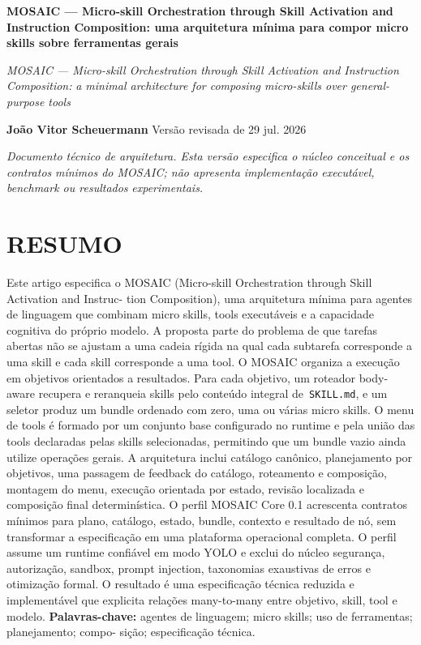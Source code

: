 \documentclass[12pt,a4paper]{article}
\begin{document}
\begin{center}\textbf{MOSAIC — Micro-skill Orchestration through Skill Activation and Instruction Composition: uma arquitetura mínima para compor micro skills sobre ferramentas gerais}\par\end{center}

\textit{MOSAIC — Micro-skill Orchestration through Skill Activation and Instruction Composition:} \textit{a minimal architecture for composing micro-skills over general-purpose tools}


\begin{center}\textbf{João Vitor Scheuermann} Versão revisada de 29 jul. 2026\end{center}

\textit{Documento técnico de arquitetura. Esta versão especifica o núcleo conceitual e os contratos} \textit{mínimos do MOSAIC; não apresenta implementação executável, benchmark ou resultados} \textit{experimentais.}


\section*{RESUMO}

Este artigo especifica o MOSAIC (Micro-skill Orchestration through Skill Activation and Instruc- tion Composition), uma arquitetura mínima para agentes de linguagem que combinam micro skills, tools executáveis e a capacidade cognitiva do próprio modelo. A proposta parte do problema de que tarefas abertas não se ajustam a uma cadeia rígida na qual cada subtarefa corresponde a uma skill e cada skill corresponde a uma tool. O MOSAIC organiza a execução em objetivos orientados a resultados. Para cada objetivo, um roteador body-aware recupera e reranqueia skills pelo conteúdo integral de\texttt{ SKILL.md}, e um seletor produz um bundle ordenado com zero, uma ou várias micro skills. O menu de tools é formado por um conjunto base configurado no runtime e pela união das tools declaradas pelas skills selecionadas, permitindo que um bundle vazio ainda utilize operações gerais. A arquitetura inclui catálogo canônico, planejamento por objetivos, uma passagem de feedback do catálogo, roteamento e composição, montagem do menu, execução orientada por estado, revisão localizada e composição final determinística. O perfil MOSAIC Core 0.1 acrescenta contratos mínimos para plano, catálogo, estado, bundle, contexto e resultado de nó, sem transformar a especificação em uma plataforma operacional completa. O perfil assume um runtime confiável em modo YOLO e exclui do núcleo segurança, autorização, sandbox, prompt injection, taxonomias exaustivas de erros e otimização formal. O resultado é uma especificação técnica reduzida e implementável que explicita relações many-to-many entre objetivo, skill, tool e modelo. \textbf{Palavras-chave:} agentes de linguagem; micro skills; uso de ferramentas; planejamento; compo- sição; especificação técnica.
\end{document}
